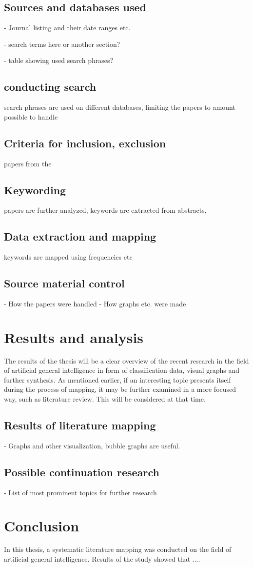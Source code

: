 \documentclass[utf8,english]{gradu3}
\begin{document}
\section{Sources and databases used}
- Journal listing and their date ranges etc.

- search terms here or another section? 

- table showing used search phrases?

\section{conducting search}
search phrases are used on different databases, limiting the papers to amount possible to handle

\section{Criteria for inclusion, exclusion}
papers from the 

\section{Keywording}
papers are further analyzed, keywords are extracted from abstracts, 

\section{Data extraction and mapping}
keywords are mapped using frequencies etc

\section{Source material control}
- How the papers were handled
- How graphs etc. were made

\chapter{Results and analysis}
The results of the thesis will be a clear overview of the recent research in the field of artificial general intelligence in form of classification data, visual graphs and further synthesis. As mentioned earlier, if an interesting topic presents itself during the process of mapping, it may be further examined in a more focused way, such as literature review. This will be considered at that time.

\section{Results of literature mapping}
- Graphs and other visualization, bubble graphs are useful.

\section{Possible continuation research}

- List of most prominent topics for further research

\chapter{Conclusion}
In this thesis, a systematic literature mapping was conducted on the field of artificial general intelligence. Results of the study showed that .... 

\printbibliography
\end{document}
